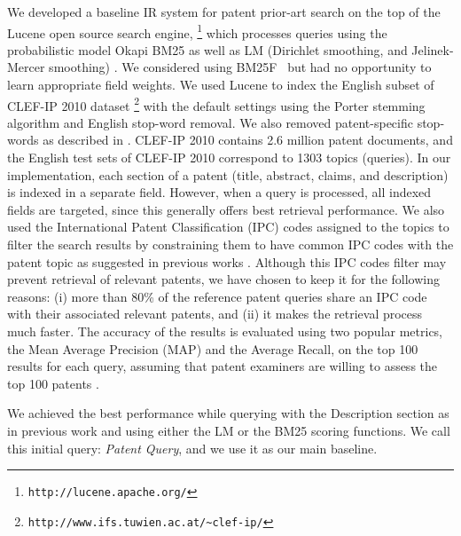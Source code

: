 We developed a baseline IR system for patent prior-art search on the top of
the Lucene open source search engine, %
\footnote{\texttt{http://lucene.apache.org/}%
} which processes queries using the probabilistic
model Okapi BM25 \cite{Robertson1993} as well as LM (Dirichlet
smoothing, and Jelinek-Mercer smoothing) \cite{Zhai2001}. We considered 
using BM25F~\cite{robertson2004simple} but had no opportunity to learn appropriate field weights.
We used Lucene to index the English subset of CLEF-IP 2010 dataset%
\footnote{\texttt{http://www.ifs.tuwien.ac.at/\textasciitilde{}clef-ip/}%
} with the default settings using the Porter stemming algorithm \cite{Porter1980} and English stop-word removal. 
We also removed patent-specific stop-words as described in \cite{magdy2012toward}.
CLEF-IP 2010 contains 2.6 million patent documents, and the English
test sets of CLEF-IP 2010 correspond to 1303 topics (queries). In
our implementation, each section of a patent (title, abstract, claims,
and description) is indexed in a separate field. However, when a query
is processed, all indexed fields are targeted, since this generally
offers best retrieval performance. We also used the International
Patent Classification (IPC) codes assigned to the topics to filter
the search results by constraining them to have common IPC codes with
the patent topic as suggested in previous works \cite{lopez2010patatras}.
Although this IPC codes filter may prevent retrieval of relevant patents, we
have chosen to keep it for the following reasons: (i) more than 80\%
of the reference patent queries share an IPC code with their associated relevant
patents, and (ii) it makes the retrieval process much faster. The accuracy of the results is evaluated using two popular metrics, the Mean Average Precision (MAP) and the Average Recall, on the top 100 results for each query, assuming that patent examiners are willing to assess the top 100 patents \cite{joho2010survey}. 

We achieved the best performance while querying with the Description
section as in previous work \cite{xue2009transforming} and using
either the LM or the BM25 scoring functions. We call this initial
query: \textit{Patent Query}, and we use it as our main baseline.

